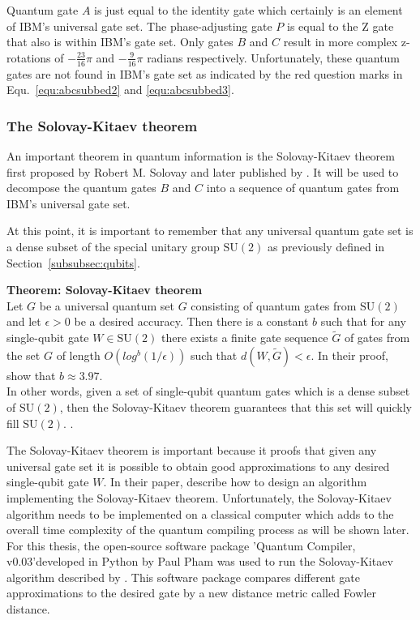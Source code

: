 Quantum gate $A$ is just equal to the identity gate which certainly is an element of IBM's universal gate set. The phase-adjusting gate $P$ is equal to the Z gate that also is within IBM's gate set. Only gates $B$ and $C$ result in more complex z-rotations of $-\frac{23}{16}\pi$ and $-\frac{9}{16}\pi$ radians respectively. Unfortunately, these quantum gates are not found in IBM's gate set as indicated by the red question marks in Equ.~\ref{equ:abcsubbed2} and \ref{equ:abcsubbed3}.

\subsubsection{The Solovay-Kitaev theorem}
\label{subsubsubsec:solovaykitaev}

An important theorem in quantum information is the Solovay-Kitaev theorem first proposed by Robert M. Solovay and later published by . It will be used to decompose the quantum gates $B$ and $C$ into a sequence of quantum gates from IBM's universal gate set.

At this point, it is important to remember that any universal quantum gate set is a dense subset of the special unitary group $\mathrm{SU}(2)$ as previously defined in Section~\ref{subsubsec:qubits}.

\begin{redbox}
\textbf{Theorem: Solovay-Kitaev theorem}\\
\newline
Let $G$ be a universal quantum set $G$ consisting of quantum gates from $\mathrm{SU}(2)$ and let $\epsilon > 0$ be a desired accuracy. Then there is a constant $b$ such that for any single-qubit gate $W \in \mathrm{SU}(2)$ there exists a
finite gate sequence $\tilde{G}$ of gates from the set $G$ of length $O(log^b (1/\epsilon))$ such that $d(W, \tilde{G}) < \epsilon$. In their proof,  show that $b \approx 3.97$.\\
\newline
In other words, given a set of single-qubit quantum gates which is a dense subset of $\mathrm{SU}(2)$, then the Solovay-Kitaev theorem guarantees that this set will quickly fill $\mathrm{SU}(2)$.
\cite{dawson2005solovay}.
\end{redbox}

The Solovay-Kitaev theorem is important because it proofs that given any universal gate set it is possible to obtain good approximations to any desired single-qubit gate $W$. In their paper,  describe how to design an algorithm implementing the Solovay-Kitaev theorem. Unfortunately, the Solovay-Kitaev algorithm needs to be implemented on a classical computer which adds to the overall time complexity of the quantum compiling process as will be shown later. For this thesis, the open-source software package 'Quantum Compiler, v0.03'\footnotemark[16] developed in Python by Paul Pham was used to run the Solovay-Kitaev algorithm described by . This software package compares different gate approximations to the desired gate by a new distance metric called Fowler distance.

